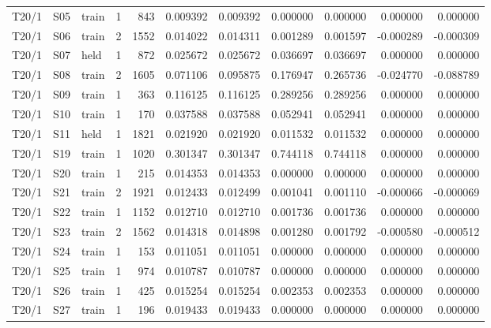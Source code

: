 \documentclass[10pt,a4paper]{article}
\begin{document}
{{\begin{longtable}{@{}lllrrrrrrrr@{}}
T20/1 & S05 & train & 1 & 843 & 0.009392 & 0.009392 & 0.000000 & 0.000000 & 0.000000 & 0.000000 \\
T20/1 & S06 & train & 2 & 1552 & 0.014022 & 0.014311 & 0.001289 & 0.001597 & -0.000289 & -0.000309 \\
T20/1 & S07 & held & 1 & 872 & 0.025672 & 0.025672 & 0.036697 & 0.036697 & 0.000000 & 0.000000 \\
T20/1 & S08 & train & 2 & 1605 & 0.071106 & 0.095875 & 0.176947 & 0.265736 & -0.024770 & -0.088789 \\
T20/1 & S09 & train & 1 & 363 & 0.116125 & 0.116125 & 0.289256 & 0.289256 & 0.000000 & 0.000000 \\
T20/1 & S10 & train & 1 & 170 & 0.037588 & 0.037588 & 0.052941 & 0.052941 & 0.000000 & 0.000000 \\
T20/1 & S11 & held & 1 & 1821 & 0.021920 & 0.021920 & 0.011532 & 0.011532 & 0.000000 & 0.000000 \\
T20/1 & S19 & train & 1 & 1020 & 0.301347 & 0.301347 & 0.744118 & 0.744118 & 0.000000 & 0.000000 \\
T20/1 & S20 & train & 1 & 215 & 0.014353 & 0.014353 & 0.000000 & 0.000000 & 0.000000 & 0.000000 \\
T20/1 & S21 & train & 2 & 1921 & 0.012433 & 0.012499 & 0.001041 & 0.001110 & -0.000066 & -0.000069 \\
T20/1 & S22 & train & 1 & 1152 & 0.012710 & 0.012710 & 0.001736 & 0.001736 & 0.000000 & 0.000000 \\
T20/1 & S23 & train & 2 & 1562 & 0.014318 & 0.014898 & 0.001280 & 0.001792 & -0.000580 & -0.000512 \\
T20/1 & S24 & train & 1 & 153 & 0.011051 & 0.011051 & 0.000000 & 0.000000 & 0.000000 & 0.000000 \\
T20/1 & S25 & train & 1 & 974 & 0.010787 & 0.010787 & 0.000000 & 0.000000 & 0.000000 & 0.000000 \\
T20/1 & S26 & train & 1 & 425 & 0.015254 & 0.015254 & 0.002353 & 0.002353 & 0.000000 & 0.000000 \\
T20/1 & S27 & train & 1 & 196 & 0.019433 & 0.019433 & 0.000000 & 0.000000 & 0.000000 & 0.000000 \\
\end{longtable}
}

}
\end{document}
